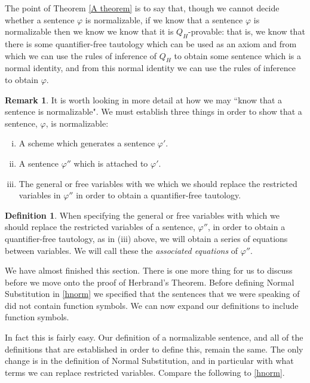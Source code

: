 \documentclass[a4paper,12pt]{report}
\theoremstyle{definition}
\newtheorem{mydef}[lem]{Definition}
\newtheorem{remark}[lem]{Remark}
\begin{document}
The point of Theorem \ref{A theorem} is to say that, though we cannot decide whether a sentence $\varphi$ is normalizable, if we know that a sentence $\varphi$ is normalizable then we know we know that it is $Q_H$-provable: that is, we know that there is some quantifier-free tautology which can be used as an axiom and from which we can use the rules of inference of $Q_H$ to obtain some sentence which is a normal identity, and from this normal identity we can use the rules of inference to obtain $\varphi$.
 
\begin{remark}
\label{norm crit}
It is worth looking in more detail at how we may ``know that a sentence is normalizable". We must establish three things in order to show that a sentence, $\varphi$, is normalizable:
\begin{enumerate}[(i)]
\item A scheme which generates a sentence $\varphi'$.
\item A sentence $\varphi''$ which is attached to $\varphi'$.
\item The general or free variables with we which we should replace the restricted variables in $\varphi''$ in order to obtain a quantifier-free tautology.
\end{enumerate}
\end{remark}

\begin{mydef} 
When specifying the general or free variables with which we should replace the restricted variables of a sentence, $\varphi''$,  in order to obtain a quantifier-free tautology, as in (iii) above, we will obtain a series of equations between variables. We will call these the \emph{associated equations} of $\varphi''$.
\end{mydef}

We have almost finished this section. There is one more thing for us to discuss before we move onto the proof of Herbrand's Theorem. Before defining Normal Substitution in \ref{hnorm} we specified that the sentences that we were speaking of did not contain function symbols. We can now expand our definitions to include function symbols.

In fact this is fairly easy. Our definition of a normalizable sentence, and all of the definitions that are established in order to define this, remain the same. The only change is in the definition of Normal Substitution, and in particular with what terms we can replace restricted variables. Compare the following to \ref{hnorm}.
\end{document}
